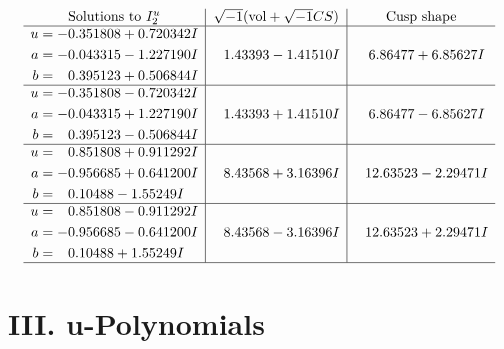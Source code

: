\documentclass[1p]{elsarticle_modified}
\theoremstyle{definition}
\newcommand{\I}{\sqrt{-1}}
\begin{document}
$$\begin{array}{c|c|c}  
\text{Solutions to }I^u_{2}& \I (\text{vol} + \sqrt{-1}CS) & \text{Cusp shape}\\
 \hline 
\begin{aligned}
u &= -0.351808 + 0.720342 I \\
a &= -0.043315 - 1.227190 I \\
b &= \phantom{-}0.395123 + 0.506844 I\end{aligned}
 & \phantom{-}1.43393 - 1.41510 I & \phantom{-}6.86477 + 6.85627 I \\ \hline\begin{aligned}
u &= -0.351808 - 0.720342 I \\
a &= -0.043315 + 1.227190 I \\
b &= \phantom{-}0.395123 - 0.506844 I\end{aligned}
 & \phantom{-}1.43393 + 1.41510 I & \phantom{-}6.86477 - 6.85627 I \\ \hline\begin{aligned}
u &= \phantom{-}0.851808 + 0.911292 I \\
a &= -0.956685 + 0.641200 I \\
b &= \phantom{-}0.10488 - 1.55249 I\end{aligned}
 & \phantom{-}8.43568 + 3.16396 I & \phantom{-}12.63523 - 2.29471 I \\ \hline\begin{aligned}
u &= \phantom{-}0.851808 - 0.911292 I \\
a &= -0.956685 - 0.641200 I \\
b &= \phantom{-}0.10488 + 1.55249 I\end{aligned}
 & \phantom{-}8.43568 - 3.16396 I & \phantom{-}12.63523 + 2.29471 I\\
 \hline 
 \end{array}$$\newpage
\newpage\renewcommand{\arraystretch}{1}
\centering \section*{ III. u-Polynomials}
\end{document}
